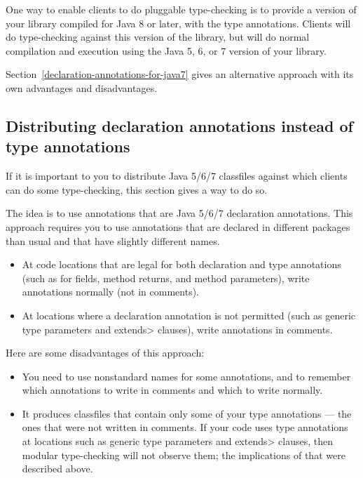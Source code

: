 One way to enable clients to do pluggable type-checking is to provide a
version of your library compiled for Java 8 or later, with the type
annotations.  Clients will do type-checking against this version of the
library, but will do normal compilation and execution using the Java 5, 6,
or 7 version of your library.

Section~\ref{declaration-annotations-for-java7} gives an alternative
approach with its own advantages and disadvantages.


\subsection{Distributing declaration annotations instead of type annotations\label{declaration-annotations-for-java7}}

If it is important to you to distribute Java 5/6/7 classfiles against which
clients can do some type-checking, this section gives a way to do so.

The idea is to
use annotations that are Java 5/6/7 declaration annotations.
This approach requires you to use annotations that are declared in
different packages than usual and that have slightly different names.

\begin{itemize}
\item
At code locations that are legal for both declaration and type
annotations (such as for fields, method returns, and method parameters),
write annotations normally (not in comments).
\item
At locations where a declaration annotation is not permitted
(such as generic type parameters and \<extends> clauses), write
annotations in comments.
\end{itemize}

Here are some disadvantages of this approach:

\begin{itemize}
\item
  You need to use nonstandard names for
  some annotations, and to remember which annotations to write in comments
  and which to write normally.
\item
  It produces classfiles that contain only some of your type annotations
  --- the ones that were not written in comments.
  If your code uses type annotations at
  locations such as generic type parameters and \<extends> clauses, then
  modular type-checking will not observe them;
  the implications of that were described above.
\end{itemize}


